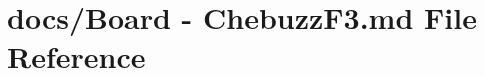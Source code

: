 \hypertarget{Board_01-_01ChebuzzF3_8md}{\section{docs/\+Board -\/ Chebuzz\+F3.\+md File Reference}
\label{Board_01-_01ChebuzzF3_8md}
}
